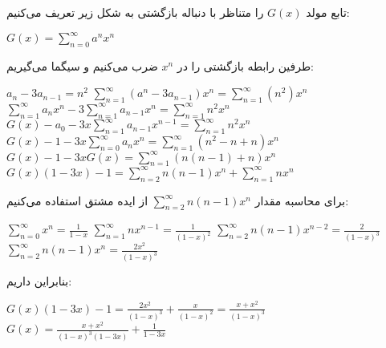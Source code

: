 \p
 تابع مولد $G(x)$ را متناظر با دنباله بازگشتی به شکل زیر تعریف می‌کنیم:
 

            \begin{center}
                $G(x) = \sum_{n = 0}^{\infty} a^nx^n$
            \end{center}
            طرفین رابطه بازگشتی را در $x^n$ ضرب می‌کنیم و سیگما می‌گیریم:
            

            \begin{center}
                $a_n - 3 a_{n-1} = n^2$ 
                \medbreak
                $\sum_{n = 1}^{\infty} (a^n - 3a_{n - 1})x^n = \sum_{n = 1}^{\infty} (n^2)x^n$
                \medbreak
                $\sum_{n = 1}^{\infty} a_nx^n - 3\sum_{n = 1}^{\infty}a_{n-1}x^n = \sum_{n = 1}^{\infty}n^2x^n$
                \medbreak
                $G(x) - a_0 - 3x\sum_{n = 1}^{\infty} a_{n-1}x^{n-1} = \sum_{n = 1}^{\infty}n^2x^n$
                \medbreak
                $G(x) - 1 - 3x\sum_{n = 0}^{\infty} a_nx^n = \sum_{n = 1}^{\infty}(n^2 - n + n)x^n$
                \medbreak
                $G(x) - 1 - 3xG(x) = \sum_{n = 1}^{\infty}(n(n - 1) + n)x^n$
                \medbreak
                $G(x)(1 - 3x) - 1 = \sum_{n = 2}^{\infty}n(n - 1)x^n + \sum_{n = 1}^{\infty} nx^n$
            \end{center}
            برای محاسبه مقدار
            $\sum_{n = 2}^{\infty}n(n - 1)x^n$
            از ایده مشتق استفاده می‌کنیم:
            \begin{center}
                $\sum_{n = 0}^{\infty} x^n = \frac{1}{1 - x}$
                \medbreak
                $\sum_{n = 1}^{\infty} nx^{n - 1} = \frac{1}{(1 - x)^2}$
                \medbreak
                $\sum_{n = 2}^{\infty} n(n - 1)x^{n - 2} = \frac{2}{(1 - x)^3} $
                \medbreak
                $\sum_{n = 2}^{\infty} n(n - 1)x^n = \frac{2x^2}{(1 - x)^3}$
            \end{center}
            بنابراین داریم:
            
            
            \begin{center}
                $G(x)(1 - 3x) - 1 = \frac{2x^2}{(1 - x)^3} + \frac{x}{(1 - x)^2} = \frac{x + x^2}{(1 - x)^3}$
                \medbreak
                $G(x) = \frac{x + x^2}{(1 - x)^3(1 - 3x)} + \frac{1}{1 - 3x}$
            \end{center}
